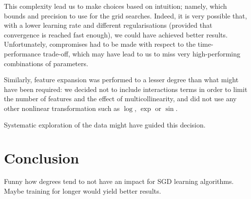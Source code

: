 \documentclass[10pt,conference,compsocconf]{IEEEtran}
\begin{document}
This complexity lead us to make choices based on intuition; namely,
which bounds and precision to use for the grid searches.
Indeed, it is very possible that, with a lower learning rate and
different regularisations (provided that convergence is reached fast
enough), we could have achieved better results.
Unfortunately, compromises had to be made with respect to the 
time-performance trade-off, which may have lead to us to
miss very high-performing combinations of parameters.

Similarly, feature expansion was performed to a lesser degree than
what might have been required: we decided not to include interactions
terms in order to limit the number of features and the effect of
multicollinearity, and did not use any other nonlinear transformation
such as $\log$, $\exp$ or $\sin$.

Systematic exploration of the data might have guided this decision.

\section{Conclusion}
Funny how degrees tend to not have an impact for SGD learning algorithms.
Maybe training for longer would yield better results.




\end{document}
